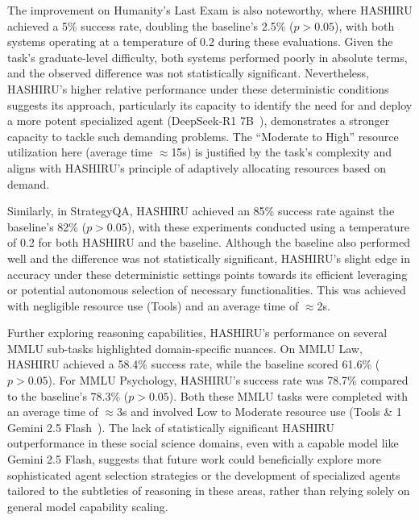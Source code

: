 \documentclass[conference]{IEEEtran}
\begin{document}
The improvement on Humanity's Last Exam is also noteworthy, where HASHIRU achieved a 5\% success rate, doubling the baseline's 2.5\% ($p > 0.05$), with both systems operating at a temperature of 0.2 during these evaluations. Given the task's graduate-level difficulty, both systems performed poorly in absolute terms, and the observed difference was not statistically significant. Nevertheless, HASHIRU's higher relative performance under these deterministic conditions suggests its approach, particularly its capacity to identify the need for and deploy a more potent specialized agent (DeepSeek-R1 7B~\cite{deepseekr1_report}), demonstrates a stronger capacity to tackle such demanding problems. The ``Moderate to High'' resource utilization here (average time $\approx$15s) is justified by the task's complexity and aligns with HASHIRU's principle of adaptively allocating resources based on demand.

Similarly, in StrategyQA, HASHIRU achieved an 85\% success rate against the baseline's 82\% ($p > 0.05$), with these experiments conducted using a temperature of 0.2 for both HASHIRU and the baseline. Although the baseline also performed well and the difference was not statistically significant, HASHIRU's slight edge in accuracy under these deterministic settings points towards its efficient leveraging or potential autonomous selection of necessary functionalities. This was achieved with negligible resource use (Tools) and an average time of $\approx$2s.

Further exploring reasoning capabilities, HASHIRU's performance on several MMLU sub-tasks highlighted domain-specific nuances. On MMLU Law, HASHIRU achieved a 58.4\% success rate, while the baseline scored 61.6\% ($p > 0.05$). For MMLU Psychology, HASHIRU's success rate was 78.7\% compared to the baseline's 78.3\% ($p > 0.05$). Both these MMLU tasks were completed with an average time of $\approx$3s and involved Low to Moderate resource use (Tools \& 1 Gemini 2.5 Flash~\cite{gemini25flash}). The lack of statistically significant HASHIRU outperformance in these social science domains, even with a capable model like Gemini 2.5 Flash, suggests that future work could beneficially explore more sophisticated agent selection strategies or the development of specialized agents tailored to the subtleties of reasoning in these areas, rather than relying solely on general model capability scaling.
\end{document}

